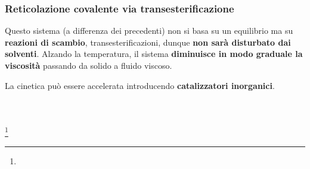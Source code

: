 \begin{frame}\frametitle{Reticolazione covalente via transesterificazione}
Questo sistema (a differenza dei precedenti) non si basa su un equilibrio ma su \textbf{reazioni di scambio}, transesterificazioni, dunque \textbf{non sarà disturbato dai solventi}.
Alzando la temperatura, il sistema \textbf{diminuisce in modo graduale la viscosità} passando da solido a fluido viscoso.

La cinetica può essere accelerata introducendo \textbf{catalizzatori inorganici}.
\begin{columns}
\begin{figure}{}\end{figure}
\begin{figure}{}\end{figure}
\end{columns}
\footnote{\tiny {}}
\end{frame}

